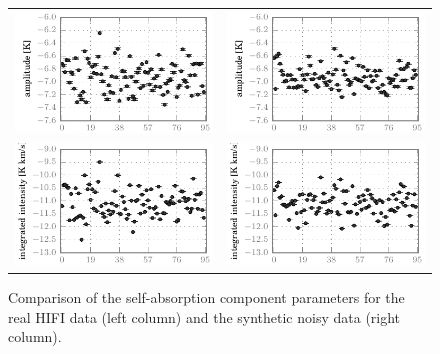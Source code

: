 \begin{figure}
\begin{tabular}{@{}c@{}c@{}}
        \includegraphics{spread_87_sabs_ampl_corrected}&
        \includegraphics{spread_87_sabs_ampl_noisy}    \\
        \includegraphics{spread_87_sabs_iint_corrected}&
        \includegraphics{spread_87_sabs_iint_noisy}    \\
    \bottomrule
    \end{tabular}
    \caption{
        Comparison of the  self-absorption component parameters for the real HIFI data (left column) and the synthetic noisy data (right column).
    }
    \label{fig:fit_sabs_87}
\end{figure}


